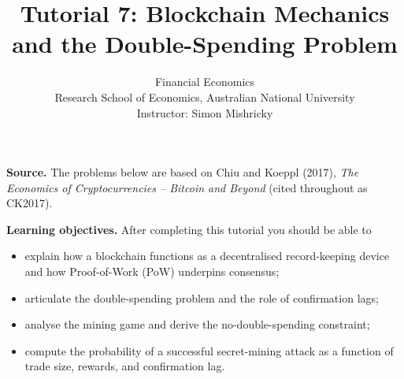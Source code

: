 \documentclass[11pt]{article}
\title{Tutorial 7: Blockchain Mechanics and the Double-Spending Problem}
\author{Financial Economics \\ Research School of Economics, Australian National University \\
\small Instructor: Simon Mishricky}
\date{}
\begin{document}
\maketitle

\noindent\textbf{Source.} The problems below are based on Chiu and Koeppl (2017),
\emph{The Economics of Cryptocurrencies -- Bitcoin and Beyond} (cited throughout as CK2017).

\medskip

\noindent\textbf{Learning objectives.} After completing this tutorial you should be able to
\begin{itemize}
    \item explain how a blockchain functions as a decentralised record-keeping device and how
          Proof-of-Work (PoW) underpins consensus;
    \item articulate the double-spending problem and the role of confirmation lags;
    \item analyse the mining game and derive the no-double-spending constraint;
    \item compute the probability of a successful secret-mining attack as a function of trade size,
          rewards, and confirmation lag.
\end{itemize}

\bigskip
\end{document}
